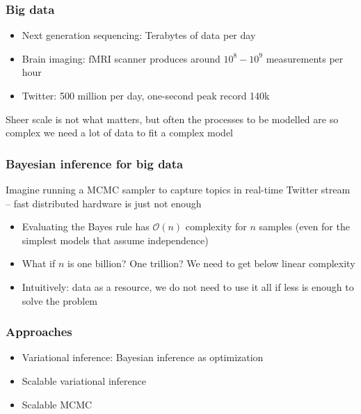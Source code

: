 \documentclass{beamer}
\begin{document}
\begin{frame}
  \frametitle{Big data}

  \begin{itemize}
    \item Next generation sequencing: Terabytes of data per day
    \item Brain imaging: fMRI scanner produces around $10^8-10^9$
      measurements per hour
    \item Twitter: 500 million per day, one-second peak record 140k
  \end{itemize}

  Sheer scale is not what matters, but often the processes to be
  modelled are so complex we need a lot of data to fit a complex model

\end{frame}

\begin{frame}
  \frametitle{Bayesian inference for big data}

  Imagine running a MCMC sampler to capture topics in real-time
  Twitter stream -- fast distributed hardware is just not enough

  \begin{itemize}
  \item Evaluating the Bayes rule has $\mathcal{O}(n)$ complexity
    for $n$ samples (even for the simplest models that assume independence)
  \item What if $n$ is one billion? One trillion? We need to get below
    linear complexity
  \item Intuitively: data as a resource, we do not need to
    use it all if less is enough to solve the problem
  \end{itemize}
\end{frame}

\begin{frame}
  \frametitle{Approaches}

  \begin{itemize}
    \item Variational inference: Bayesian inference as optimization
    \item Scalable variational inference
    \item Scalable MCMC
  \end{itemize}
\end{frame}
\end{document}
